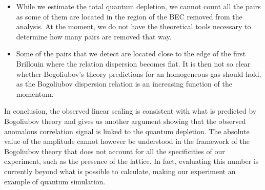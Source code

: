 \begin{itemize}
    \item While we estimate the total quantum depletion, we cannot count all the pairs as some of them are located in the region of the BEC removed from the analysis. At the moment, we do not have the theoretical tools necessary to determine how many pairs are removed that way.
    \item Some of the pairs that we detect are located close to the edge of the first Brillouin where the relation dispersion becomes flat. It is then not so clear whether Bogoliubov's theory predictions for an homogeneous gas should hold, as the Bogoliubov dispersion relation is an increasing function of the momentum.
\end{itemize}

\begin{table}[]
    \centering
    {
    }
    \caption{Average number of detected \kmk pairs per experimental run and fraction of quantum depleted atoms in the depletion for different total atom numbers.}
    \label{tab:nb_pairs}
\end{table}



In conclusion, the observed linear scaling is consistent with what is predicted by Bogoliubov theory and gives us another argument showing that the observed anomalous correlation signal is linked to the quantum depletion. The absolute value of the amplitude cannot however be understood in the framework of the Bogoliubov theory \cite{butera2020} that does not account for all the specificities of our experiment, such as the presence of the lattice. In fact, evaluating this number is currently beyond what is possible to calculate, making our experiment an example of quantum simulation.


